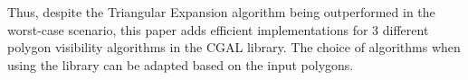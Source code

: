 Thus, despite the Triangular Expansion algorithm being outperformed in the worst-case scenario, this paper adds efficient implementations for  3 different  polygon visibility algorithms in the CGAL library. The choice of algorithms when using the library can be adapted based on the input polygons. 
